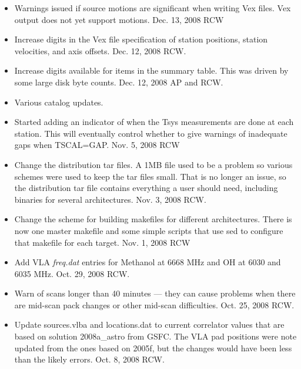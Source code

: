\documentclass{report}
\begin{document}
\begin{itemize}


\item  Warnings issued if source motions are significant when writing Vex
       files.  Vex output does not yet support motions.  Dec. 13, 2008
       RCW

\item  Increase digits in the Vex file specification of station positions,
       station velocities, and axis offsets.  Dec. 12, 2008  RCW.

\item  Increase digits available for items in the summary table.  This
       was driven by some large disk byte counts.  Dec. 12, 2008  AP and
       RCW.

\item  Various catalog updates.

\item  Started adding an indicator of when the Tsys measurements are done
       at each station.  This will eventually control whether to give
       warnings of inadequate gaps when TSCAL=GAP.  Nov. 5, 2008 RCW

\item  Change the distribution tar files.  A 1MB file used to be a problem
       so various schemes were used to keep the tar files small.  That is
       no longer an issue, so the distribution tar file contains everything
       a user should need, including binaries for several architectures.
       Nov. 3, 2008  RCW.

\item  Change the scheme for building makefiles for different architectures.
       There is now one master makefile and some simple scripts that use
       sed to configure that makefile for each target.  Nov. 1, 2008  RCW

\item  Add VLA {\sl freq.dat} entries for Methanol at 6668 MHz and OH at
       6030 and 6035 MHz.  Oct. 29, 2008  RCW.

\item  Warn of scans longer than 40 minutes --- they can cause problems when
       there are mid-scan pack changes or other mid-scan difficulties.
       Oct. 25, 2008  RCW.

\item  Update sources.vlba and locations.dat to current correlator values
       that are based on solution 2008a\_astro from GSFC.  The VLA pad
       positions were note updated from the ones based on 2005f, but the
       changes would have been less than the likely errors.
       Oct. 8, 2008  RCW.


\end{itemize}
\end{document}
